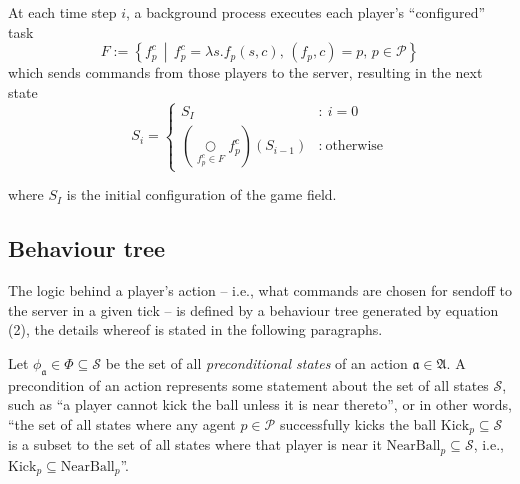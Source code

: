 At each time step \(i\), a background process executes each player's ``configured'' task
\[
		F := \left\{ f_p^c \,\middle|\, f_p^c = \lambda s.f_p(s, c),\, (f_p, c) = p,\, p \in\mathcal{P} \right\}
\]
which sends commands from those players to the server, resulting in the next state
\begin{equation}
		S_{i} = \left\{
			\begin{array}{cl}
				S_I & : \ i = 0 \\
				\left(\underset{f_p^c\in F}\bigcirc f_p^c\right)(S_{i-1}) & : \ \text{otherwise}
			\end{array}
		\right. %
\end{equation}

where \(S_I\) is the initial configuration of the game field.

\subsection{Behaviour tree}
The logic behind a player's action -- i.e., what commands are chosen for sendoff to the server in a given tick -- is defined by a behaviour tree generated by equation (2), the details whereof is stated in the following paragraphs.

Let \(\phi_\mathfrak{a}\in\Phi\subseteq\mathcal{S}\) be the set of all \textit{preconditional states} of an action \(\mathfrak{a}\in\mathfrak{A}\). A precondition of an action represents some statement about the set of all states \(\mathcal{S}\), such as ``a player cannot kick the ball unless it is near thereto'', or in other words, ``the set of all states where any agent \(p\in\mathcal{P}\) successfully kicks the ball \(\text{Kick}_p \subseteq \mathcal{S}\) is a subset to the set of all states where that player is near it \(\text{NearBall}_p \subseteq \mathcal{S}\), i.e., \(\text{Kick}_p \subseteq \text{NearBall}_p\)''.

